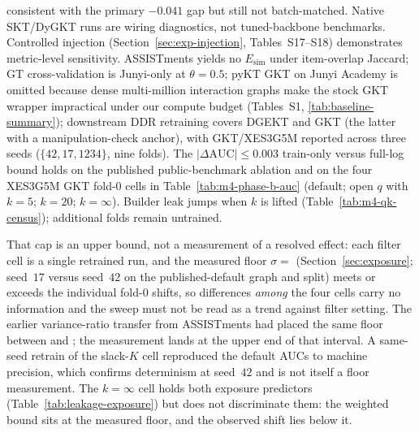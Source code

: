 \documentclass[preprint,10pt,doubleblind]{elsarticle}
\newcommand{\Esim}{\ensuremath{E_{\text{sim}}}}
\newcommand{\DDR}{\textsc{DDR}}
\begin{document}
consistent with the primary $-0.041$ gap but still not batch-matched.
Native SKT/DyGKT runs
are wiring diagnostics, not tuned-backbone benchmarks. Controlled injection
(Section~\ref{sec:exp-injection}, Tables~S17--S18) demonstrates metric-level
sensitivity. ASSISTments yields no $\Esim$ under item-overlap Jaccard; GT
cross-validation is Junyi-only at $\theta{=}0.5$; pyKT GKT on Junyi Academy
is omitted because dense multi-million interaction graphs make the stock GKT
wrapper impractical under our compute budget (Tables~S1, \ref{tab:baseline-summary});
downstream \DDR{} retraining covers DGEKT and GKT (the latter with a
manipulation-check anchor), with GKT/XES3G5M reported across three seeds
($\{42,17,1234\}$, nine folds).
The $|{\Delta}\mathrm{AUC}|{\le}0.003$ train-only versus full-log bound holds
on the published public-benchmark ablation and on the four XES3G5M GKT fold-0
cells in Table~\ref{tab:m4-phase-b-auc} (default; open $q$ with $k{=}5$;
$k{=}20$; $k{=}\infty$). Builder leak jumps when $k$ is lifted
(Table~\ref{tab:m4-qk-census}); additional folds remain untrained.

That cap is an upper bound, not a measurement of a resolved effect: each
filter cell is a single retrained run, and the measured floor
$\sigma{=}$\NoiseFloorPrimaryMeas{} (Section~\ref{sec:exposure}; seed~$17$
versus seed~$42$ on the published-default graph and split) meets or exceeds
the individual fold-0 shifts, so differences \emph{among} the four cells
carry no information and the sweep must not be read as a trend against
filter setting. The earlier variance-ratio transfer from ASSISTments had
placed the same floor between \NoiseFloorPrimaryLow{} and
\NoiseFloorPrimaryHigh{}; the measurement lands at the upper end of that
interval. A same-seed retrain of the slack-$K$ cell reproduced the default
AUCs to machine precision, which confirms determinism at seed~$42$ and is
not itself a floor measurement.
The $k{=}\infty$ cell holds both exposure predictors
(Table~\ref{tab:leakage-exposure}) but does not discriminate them: the
weighted bound sits at the measured floor, and the observed shift lies
below it.
\end{document}
